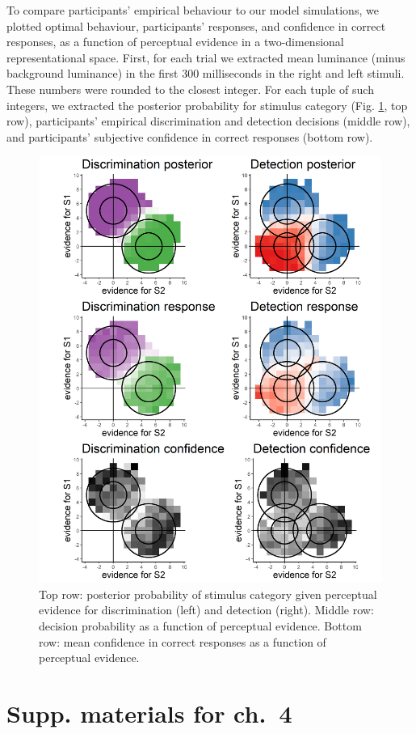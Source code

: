 \documentclass[12pt,twoside]{reedthesis}
\begin{document}
To compare participants' empirical behaviour to our model simulations, we plotted optimal behaviour, participants' responses, and confidence in correct responses, as a function of perceptual evidence in a two-dimensional representational space. First, for each trial we extracted mean luminance (minus background luminance) in the first 300 milliseconds in the right and left stimuli. These numbers were rounded to the closest integer. For each tuple of such integers, we extracted the posterior probability for stimulus category (Fig. \ref{fig:RC-2d-empirical}, top row), participants' empirical discrimination and detection decisions (middle row), and participants' subjective confidence in correct responses (bottom row).
\begin{figure}
\includegraphics[width=0.6\linewidth]{figure/RC/empirical_tile} \caption{Top row: posterior probability of stimulus category given perceptual evidence for discrimination (left) and detection (right). Middle row: decision probability as a function of perceptual evidence. Bottom row: mean confidence in correct responses as a function of perceptual evidence.}\label{fig:RC-2d-empirical}
\end{figure}
\hypertarget{supp.-materials-for-ch.-4}{%
\chapter{Supp. materials for ch.~4}\label{supp.-materials-for-ch.-4}}
\end{document}
